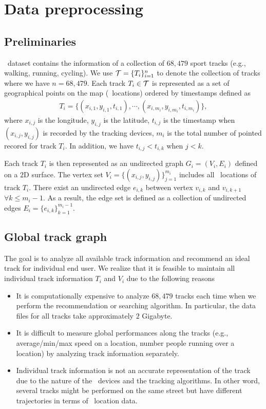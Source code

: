 
\section{Data preprocessing}

\subsection{Preliminaries}

\edmd\ dataset contains the information of a collection of $68,479$ sport tracks (e.g., walking, running, cycling).
We use $\mathcal{T}=\{T_i\}_{i=1}^n$ to denote the collection of tracks where we have $n=68,479$.
Each track $T_i\in\mathcal{T}$ is represented as a set of geographical points on the map (\gps\ locations) ordered by timestamps defined as
\begin{align*}
	T_i = \{(x_{i,1},y_{i,1},t_{i,1}),\cdots,(x_{i,m_i},y_{i,m_i},t_{i,m_i})\},
\end{align*}
where $x_{i,j}$ is the longitude, $y_{i,j}$ is the latitude, $t_{i,j}$ is the timestamp when $(x_{i,j},y_{i,j})$ is recorded by the tracking devices, $m_i$ is the total number of pointed recored for track $T_i$.
In addition, we have $t_{i,j}<t_{i,k}$ when $j<k$.

Each track $T_i$ is then represented as an undirected graph $G_i = (V_i,E_i)$ defined on a $2$D surface.
The vertex set $V_i=\{(x_{i,j},y_{i,j})\}_{j=1}^{m_i}$ includes all \gps\ locations of track $T_i$.
There exist an undirected edge $e_{i,k}$ between vertex $v_{i,k}$ and $v_{i,k+1}$ $\forall k\le m_i-1$.
As a result, the edge set is defined as a collection of undirected edges $E_i = \{e_{i,k}\}_{k=1}^{m_i-1}$.

\subsection{Global track graph}

The goal is to analyze all available track information and recommend an ideal track for individual end user.
We realize that it is feasible to maintain all individual track information $T_i$ and $V_i$ due to the following reasons
\begin{itemize}
	\item It is computationally expensive to analyze $68,479$ tracks each time when we perform the recommendation or searching algorithm. In particular, the data files for all tracks take approximately $2$ Gigabyte.
	\item It is difficult to measure global performances along the tracks (e.g., average/min/max speed on a location, number people running over a location) by analyzing track information separately. 
	\item Individual track information is not an accurate representation of the track due to the nature of the \gps\ devices and the tracking algorithms. In other word, several tracks might be performed on the same street but have different trajectories in terms of \gps\ location data. 
\end{itemize} 

